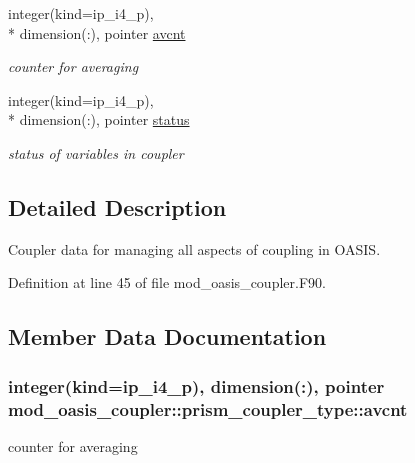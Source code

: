 \begin{DoxyCompactItemize}
integer(kind=ip\+\_\+i4\+\_\+p), \\*
dimension(\+:), pointer \hyperlink{structmod__oasis__coupler_1_1prism__coupler__type_accd8eb166c6aac75690be947dec43ccc}{avcnt}
\begin{DoxyCompactList}\small\item\em counter for averaging \end{DoxyCompactList}\item 
integer(kind=ip\+\_\+i4\+\_\+p), \\*
dimension(\+:), pointer \hyperlink{structmod__oasis__coupler_1_1prism__coupler__type_aee26373fa4a84f3c4e1841ba702f161c}{status}
\begin{DoxyCompactList}\small\item\em status of variables in coupler \end{DoxyCompactList}\end{DoxyCompactItemize}


\subsection{Detailed Description}
Coupler data for managing all aspects of coupling in O\+A\+S\+I\+S. 

Definition at line 45 of file mod\+\_\+oasis\+\_\+coupler.\+F90.



\subsection{Member Data Documentation}
\hypertarget{structmod__oasis__coupler_1_1prism__coupler__type_accd8eb166c6aac75690be947dec43ccc}{
\subsubsection[{avcnt}]{\setlength{\rightskip}{0pt plus 5cm}integer(kind=ip\+\_\+i4\+\_\+p), dimension(\+:), pointer mod\+\_\+oasis\+\_\+coupler\+::prism\+\_\+coupler\+\_\+type\+::avcnt\hspace{0.3cm}{\ttfamily [private]}}}\label{structmod__oasis__coupler_1_1prism__coupler__type_accd8eb166c6aac75690be947dec43ccc}


counter for averaging 



